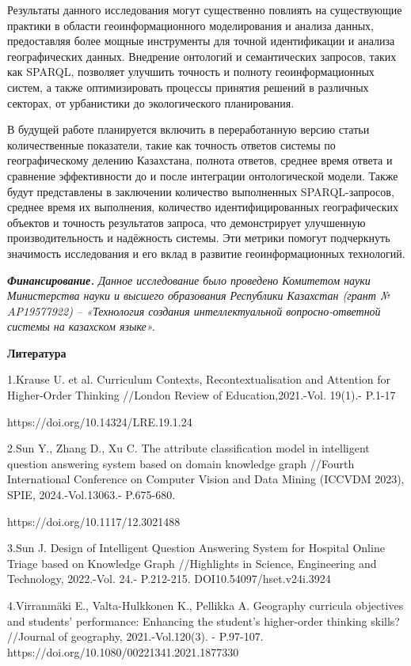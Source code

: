 Результаты данного исследования могут существенно повлиять на
существующие практики в области геоинформационного моделирования и
анализа данных, предоставляя более мощные инструменты для точной
идентификации и анализа географических данных. Внедрение онтологий и
семантических запросов, таких как SPARQL, позволяет улучшить точность и
полноту геоинформационных систем, а также оптимизировать процессы
принятия решений в различных секторах, от урбанистики до экологического
планирования.

В будущей работе планируется включить в переработанную версию статьи
количественные показатели, такие как точность ответов системы по
географическому делению Казахстана, полнота ответов, среднее время
ответа и сравнение эффективности до и после интеграции онтологической
модели. Также будут представлены в заключении количество выполненных
SPARQL-запросов, среднее время их выполнения, количество
идентифицированных географических объектов и точность результатов
запроса, что демонстрирует улучшенную производительность и надёжность
системы. Эти метрики помогут подчеркнуть значимость исследования и его
вклад в развитие геоинформационных технологий.

\emph{\textbf{Финансирование.} Данное исследование было проведено
Комитетом науки Министерства науки и высшего образования Республики
Казахстан (грант № AP19577922) -- «Технология создания интеллектуальной
вопросно-ответной системы на казахском языке».}

\textbf{Литература}

1.Krause U. et al. Curriculum Contexts, Recontextualisation and
Attention for Higher-Order Thinking //London Review of
Education,2021.-Vol. 19(1).- P.1-17

https://doi.org/10.14324/LRE.19.1.24

2.Sun Y., Zhang D., Xu C. The attribute classification model in
intelligent question answering system based on domain knowledge graph
//Fourth International Conference on Computer Vision and Data Mining
(ICCVDM 2023), SPIE, 2024.-Vol.13063.- P.675-680.

https://doi.org/10.1117/12.3021488

3.Sun J. Design of Intelligent Question Answering System for Hospital
Online Triage based on Knowledge Graph //Highlights in Science,
Engineering and Technology, 2022.-Vol. 24.- P.212-215.
DOI10.54097/hset.v24i.3924

4.Virranmäki E., Valta-Hulkkonen K., Pellikka A. Geography curricula
objectives and students' performance: Enhancing the student's
higher-order thinking skills? //Journal of geography, 2021.-Vol.120(3).
- P.97-107. https://doi.org/10.1080/00221341.2021.1877330

